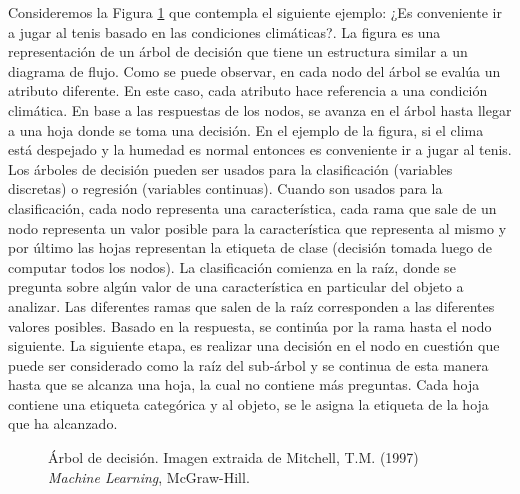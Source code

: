 	Consideremos la Figura \ref{fig: Arbol de decision} que contempla el siguiente ejemplo: ¿Es conveniente ir a jugar al tenis basado en las condiciones climáticas?. La figura es una representación de un árbol de decisión que tiene un estructura similar a un diagrama de flujo. Como se puede observar, en cada nodo del árbol se evalúa un atributo diferente. En este caso, cada atributo hace referencia a una condición climática. En base a las respuestas de los nodos, se avanza en el árbol hasta llegar a una hoja donde se toma una decisión. En el ejemplo de la figura, si el clima está despejado y la humedad es normal entonces es conveniente ir a jugar al tenis. Los árboles de decisión pueden ser usados para la clasificación (variables discretas) o regresión (variables continuas). Cuando son usados para la clasificación, cada nodo representa una característica, cada rama que sale de un nodo representa un valor posible para la característica que representa al mismo y por último las hojas representan la etiqueta de clase (decisión tomada luego de computar todos los nodos). La clasificación comienza en la raíz, donde se pregunta sobre algún valor de una característica en particular del objeto a analizar. Las diferentes ramas que salen de la  raíz corresponden a las diferentes valores posibles. Basado en la respuesta, se continúa por la rama hasta el nodo siguiente. La siguiente etapa, es realizar una decisión en el nodo en cuestión que puede ser considerado como la raíz del sub-árbol y se continua de esta manera hasta que se alcanza una hoja, la cual no contiene más preguntas. Cada hoja contiene una etiqueta categórica y al objeto, se le asigna la etiqueta de la hoja que ha alcanzado.
	
		\begin{figure}[htbp]
			\centering
			\caption[Árbol de decisión]{Árbol de decisión. Imagen extraida de Mitchell, T.M. (1997) \textit{Machine Learning}, McGraw-Hill.}
			\label{fig: Arbol de decision}
		\end{figure}
		

